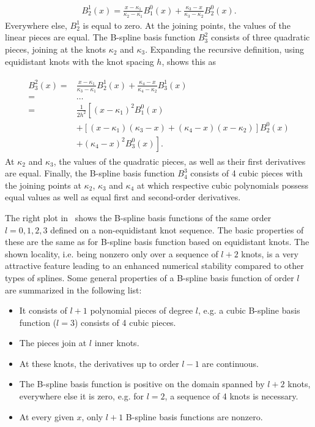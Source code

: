 \begin{align} \label{eq:Bspline-BF_21}
	B_2^1(x) = \frac{x - \kappa_1}{\kappa_2 - \kappa_1} B_1^0(x) + \frac{\kappa_3 - x}{\kappa_3 - \kappa_2} B_2^0(x).
\end{align}
%
Everywhere else, $B_2^1$ is equal to zero. At the joining points, the values of the linear pieces are equal. The B-spline basis function $B_3^2$ consists of three quadratic pieces, joining at the knots $\kappa_2$ and $\kappa_3$. Expanding the recursive definition, using equidistant knots with the knot spacing $h$, shows this as

\begin{align} \label{eq:Bspline-BF_32}
	\begin{split}
	B_3^2(x) ={}& \frac{x - \kappa_1}{\kappa_3 - \kappa_1} B_2^1(x) + \frac{\kappa_4 - x}{\kappa_4 - \kappa_2} B_3^1(x) \\
			 ={}& \dots \\
			 ={}& \frac{1}{2h^2} \left[ (x-\kappa_1)^2 B_1^0(x) \right. \\ 
			    &+ \left. [(x-\kappa_1)(\kappa_3 - x) + (\kappa_4 - x)(x - \kappa_2)] B_2^0(x) \right. \\ 
			 	&+ \left. (\kappa_4 - x)^2 B_3^0(x) \right].
	\end{split}
\end{align}
%
At $\kappa_2$ and $\kappa_3$, the values of the quadratic pieces, as well as their first derivatives are equal. Finally, the B-spline basis function $B_4^3$ consists of 4 cubic pieces with the joining points at $\kappa_2$, $\kappa_3$ and $\kappa_4$ at which respective cubic polynomials possess equal values as well as equal first and second-order derivatives. 

The right plot in~ shows the B-spline basis functions of the same order $l=0,1,2,3$ defined on a non-equidistant knot sequence. The basic properties of these are the same as for B-spline basis function based on equidistant knots. The shown locality, i.e. being nonzero only over a sequence of $l+2$ knots, is a very attractive feature leading to an enhanced numerical stability compared to other types of splines. Some general properties of a B-spline basis function of order $l$ are summarized in the following list:

\begin{itemize}
	\item It consists of $l+1$ polynomial pieces of degree $l$, e.g. a cubic B-spline basis function ($l=3$) consists of 4 cubic pieces.
	\item The pieces join at $l$ inner knots.
	\item At these knots, the derivatives up to order $l-1$ are continuous.
	\item The B-spline basis function is positive on the domain spanned by $l+2$ knots, everywhere else it is zero, e.g. for $l=2$, a sequence of 4 knots is necessary.
	\item At every given $x$, only $l+1$ B-spline basis functions are nonzero.
\end{itemize}

